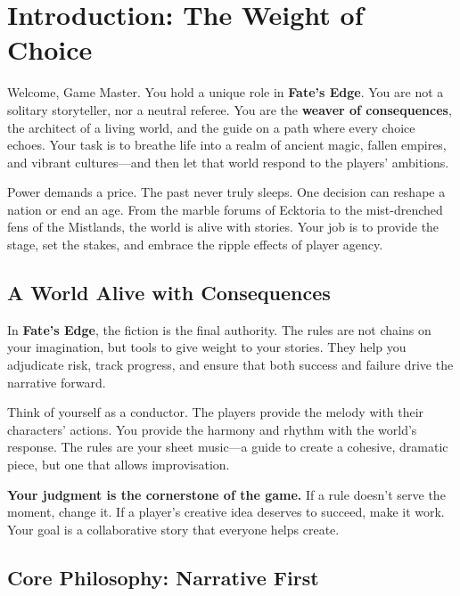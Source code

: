 \chapter{Introduction: The Weight of Choice}
\label{ch:gm-intro}

Welcome, Game Master. You hold a unique role in \textbf{Fate's Edge}. You are not a solitary storyteller, nor a neutral referee. You are the \textbf{weaver of consequences}, the architect of a living world, and the guide on a path where every choice echoes. Your task is to breathe life into a realm of ancient magic, fallen empires, and vibrant cultures—and then let that world respond to the players’ ambitions.

Power demands a price. The past never truly sleeps. One decision can reshape a nation or end an age. From the marble forums of Ecktoria to the mist-drenched fens of the Mistlands, the world is alive with stories. Your job is to provide the stage, set the stakes, and embrace the ripple effects of player agency.

\section{A World Alive with Consequences}
\label{sec:gm-consequences}

In \textbf{Fate's Edge}, the fiction is the final authority. The rules are not chains on your imagination, but tools to give weight to your stories. They help you adjudicate risk, track progress, and ensure that both success and failure drive the narrative forward.

Think of yourself as a conductor. The players provide the melody with their characters’ actions. You provide the harmony and rhythm with the world’s response. The rules are your sheet music—a guide to create a cohesive, dramatic piece, but one that allows improvisation.

\vspace{2mm}
\noindent \textbf{Your judgment is the cornerstone of the game.} If a rule doesn’t serve the moment, change it. If a player’s creative idea deserves to succeed, make it work. Your goal is a collaborative story that everyone helps create.

\section{Core Philosophy: Narrative First}
\label{sec:gm-narrative-first}

